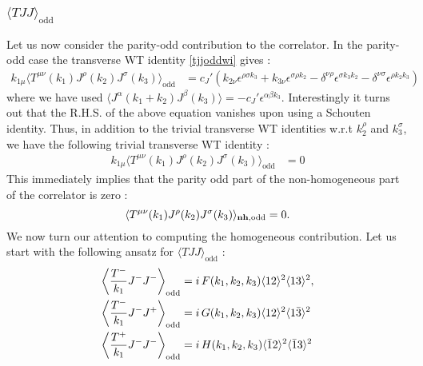 \documentclass[a4paper,11pt]{article}
\begin{document}
\subsubsection*{{\bf{$\langle TJJ \rangle_{\text{odd}}$}}}
Let us now consider the parity-odd contribution to the correlator. In the parity-odd case the transverse WT identity 
\eqref{tjjoddwi} gives :
\begin{align}\label{wtjt1}
k_{1\mu}\langle T^{\mu\nu}(k_1)J^{\rho}(k_2)J^{\sigma}(k_3) \rangle_{\text{odd}}&= c_J'\left(k_{2\nu}\epsilon^{\rho\sigma k_3} +k_{3\nu}\epsilon^{\sigma\rho k_2}-\delta^{\nu\rho}\epsilon^{\sigma k_3 k_2}-\delta^{\nu\sigma}\epsilon^{\rho k_2 k_3}\right)
\end{align}
where we have used  $\langle J^{\alpha}(k_1+k_2) J^{\beta}(k_3) \rangle = -c_J' \epsilon^{\alpha \beta k_3}.$ 
Interestingly it turns out that the R.H.S. of the above equation vanishes upon using a Schouten identity. Thus, in addition to the trivial transverse WT identities w.r.t $k_2^\rho$ and $k_3^\sigma$, we have the following trivial transverse WT identity :
\begin{align}\label{tjjoddwifnl}
k_{1\mu}\langle T^{\mu\nu}(k_1)J^{\rho}(k_2)J^{\sigma}(k_3) \rangle_{\text{odd}} &= 0
\end{align}
This immediately implies that the parity odd part of the non-homogeneous part of the correlator is zero :
\begin{equation}
   \langle T^{\mu\nu}(k_1)J^{\rho}(k_2)J^{\sigma}(k_3) \rangle_{\bf{nh},\text{odd}} =0.
\end{equation}
We now turn our attention to computing the homogeneous contribution. 
Let us start with the following ansatz for $\langle TJJ \rangle_{\text{odd}}$ : 
\begin{align}\label{tjjansatz}
\left\langle \frac{T^-}{k_1}J^-J^- \right\rangle_{\text{odd}}&= i\,F(k_1, k_2, k_3)\langle 12 \rangle^2 \langle 13 \rangle^2,\notag\\
\left\langle \frac{T^-}{k_1}J^-J^+ \right\rangle_{\text{odd}} &=i\,G(k_1, k_2, k_3)\langle 12 \rangle^2 \langle 1\bar{3} \rangle^2\notag\\
\left\langle \frac{T^+}{k_1} J^- J^- \right\rangle_{\text{odd}}&=i\,H(k_1, k_2, k_3)\langle \bar{1}2 \rangle^2 \langle \bar{1}3 \rangle^2
\end{align}
\end{document}
